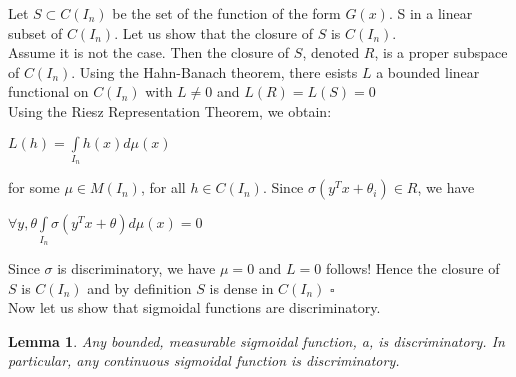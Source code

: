 \documentclass[12pt, a4paper]{article}
\newtheorem{lemma}{Lemma}
\newenvironment{proof}{{\sc Proof:}}{\hfill $\square$}
\begin{document}
\begin{proof}
  Let $S \subset C(I_n)$ be the set of the function of the form $G(x)$. S in a linear subset of $C(I_n)$. Let us show that the closure of $S$ is $C(I_n)$.\\
  Assume it is not the case. Then the closure of $S$, denoted $R$, is a proper subspace of $C(I_n)$. Using the Hahn-Banach theorem, there esists $L$ a bounded linear functional on $C(I_n)$ with $L \ne 0$ and  $L(R) = L(S) = 0$\\
  Using the Riesz Representation Theorem, we obtain:\\
  \begin{center}
    $L(h) = \int\limits_{I_n} h(x)d\mu(x)$
  \end{center}
  for some $\mu \in M(I_n)$, for all $h\in C(I_n)$. Since $\sigma(y^Tx + \theta_i)  \in R$, we have\\
  \begin{center}
    $\forall y, \theta \int\limits_{I_n} \sigma(y^Tx + \theta) d\mu(x) = 0$
  \end{center}
  Since $\sigma$ is discriminatory, we have $\mu = 0$ and $L = 0$ follows!
  Hence the closure of $S$ is $C(I_n)$ and by definition $S$ is dense in $C(I_n)$
\end{proof}\\
\Sv
  Now let us show that sigmoidal functions are discriminatory.
  \begin{lemma}
    Any bounded, measurable sigmoidal function, a, is discriminatory. In particular, any continuous sigmoidal function is discriminatory.
  \end{lemma}
\end{document}
